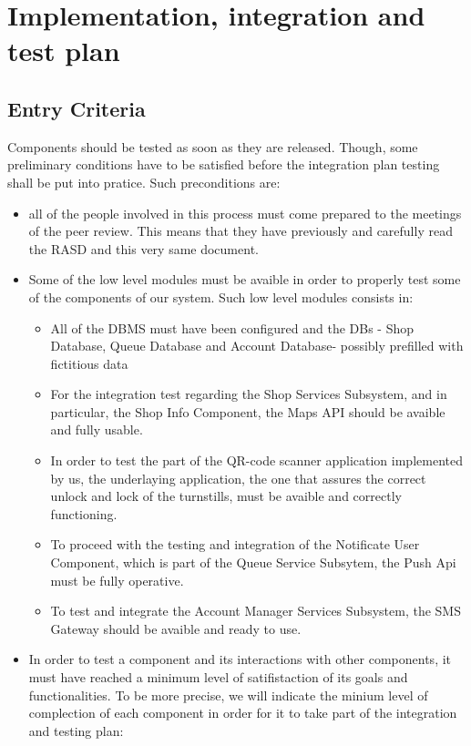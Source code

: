 \section{Implementation, integration and test plan}
\label{sect:implementationintegrationandtestplan}

\subsection{Entry Criteria}
\label{subsect: entrycriteria}
Components should be tested as soon as they are released. Though, some preliminary conditions have to be satisfied before the integration plan testing shall be put into pratice.
Such preconditions are:
\begin{itemize}
    \item all of the people involved in this process must come prepared to the meetings of the peer review. This means that they have previously and carefully read the RASD and this very same document.
    \item Some of the low level modules must be avaible in order to properly test some of the components of our system. Such low level modules consists in:
        \begin{itemize}
            \item All of the DBMS must have been configured and the DBs - Shop Database, Queue Database and Account Database- possibly prefilled with fictitious data
            \item For the integration test regarding the Shop Services Subsystem, and in particular, the Shop Info Component, the Maps API should be avaible and fully usable.
            \item In order to test the part of the QR-code scanner application implemented by us, the underlaying application, the one that assures the correct unlock and lock of the turnstills, must be avaible and correctly functioning. 
            \item To proceed with the testing and integration of the Notificate User Component, which is part of the Queue Service Subsytem, the Push Api must be fully operative.
            \item To test and integrate the Account Manager Services Subsystem, the SMS Gateway should be avaible and ready to use.
        \end{itemize}
        \item In order to test a component and its interactions with other components, it must have reached a minimum level of satifistaction of its goals and functionalities. To be more precise, we will indicate the minium level of complection of each component in order for it to take part of the integration and testing plan:

\end{itemize}
